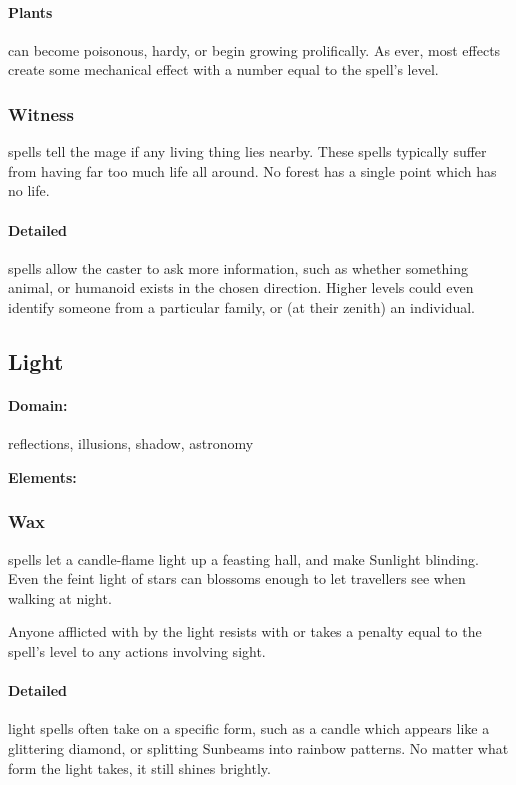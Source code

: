 \begin{multicols}{2}
\paragraph{Plants}
can become poisonous, hardy, or begin growing prolifically.
As ever, most effects create some mechanical effect with a number equal to the spell's level.

\subsubsection{Witness}
spells tell the mage if any living thing lies nearby.
These spells typically suffer from having far too much life all around.
No forest has a single point which has no life.

\paragraph{Detailed}
spells allow the caster to ask more information, such as whether something animal, or humanoid exists in the chosen direction.
Higher levels could even identify someone from a particular family, or (at their zenith) an individual.

\subsection{Light}
\paragraph{Domain:}
reflections, illusions, shadow, astronomy

\textbf{Elements:}


\subsubsection{Wax}
spells let a candle-flame light up a feasting hall, and make Sunlight blinding.
Even the feint light of stars can blossoms enough to let travellers see when walking at night.

Anyone afflicted with by the light resists with  or takes a penalty equal to the spell's level to any actions involving sight.

\paragraph{Detailed}
light spells often take on a specific form, such as a candle which appears like a glittering diamond, or splitting Sunbeams into rainbow patterns.
No matter what form the light takes, it still shines brightly.


\end{multicols}
